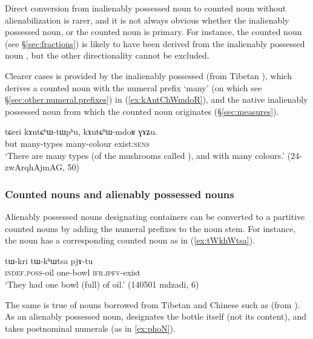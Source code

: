 Direct conversion from inalienably possessed noun to counted noun without alienabilization is rarer, and it is not always obvious whether the inalienably possessed noun, or the counted noun is primary. For instance, the counted noun  (see §\ref{sec:fractions}) is likely to have been derived from the inalienably possessed noun , but the other directionality cannot be excluded. 

Clearer cases is provided by the inalienably possessed   (from Tibetan ), which derives a counted noun with the numeral prefix  `many' (on which see §\ref{sec:other.numeral.prefixes}) in (\ref{ex:kAntChWmdoR}), and the native inalienably possessed noun  from which the counted noun  originates (§\ref{sec:measures}).

\begin{exe}
\ex \label{ex:kAntChWmdoR}
\gll  tɕeri kɤntɕʰɯ-tɯpʰu, kɤntɕʰɯ-mdoʁ ɣɤʑu. \\
 but many-types many-colour exist:\textsc{sens} \\
\glt  `There are many types (of the mushrooms called ), and with many colours.' (24-zwArqhAjmAG, 50)
\end{exe}

\subsubsection{Counted nouns and alienably possessed nouns}   \label{sec:CN.APN}
Alienably possessed nouns designating containers can be converted to a partitive counted nouns by adding the numeral prefixes to the noun stem. For instance, the noun  has a corresponding counted noun   as in (\ref{ex:tWkhWtsa}).

 \begin{exe}
\ex \label{ex:tWkhWtsa}
\gll tɯ-kri tɯ-kʰɯtsa pjɤ-tu \\
\textsc{indef}.\textsc{poss}-oil  one-bowl \textsc{ifr}.\textsc{ipfv}-exist \\
\glt `They had one bowl (full) of oil.' (140501 mdzadi, 6)
\end{exe}

The same is true of nouns borrowed from Tibetan and Chinese such as  (from ). As an alienably possessed noun,  designates the bottle itself (not its content), and takes postnominal numerals (as in \ref{ex:phoN}).

